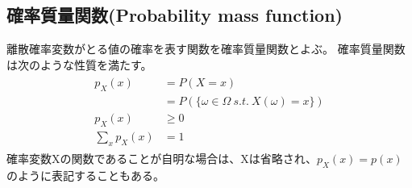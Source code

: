 \documentclass[a4j]{jarticle}
\begin{document}
\subsection{確率質量関数(Probability mass function)}
離散確率変数がとる値の確率を表す関数を確率質量関数とよぶ。
確率質量関数は次のような性質を満たす。
\begin{align}
    \begin{aligned}
    p_{X}(x)&=P(X=x) \\
    &=P(\{\omega \in \Omega \ s.t. \ X(\omega)=x\}) \\
    p_{X}(x) &\geq 0 \\
    \sum_{x} p_{X}(x) &= 1 
    \end{aligned}
\end{align}
確率変数Xの関数であることが自明な場合は、Xは省略され、$p_{X}(x)=p(x)$のように表記することもある。
\end{document}
